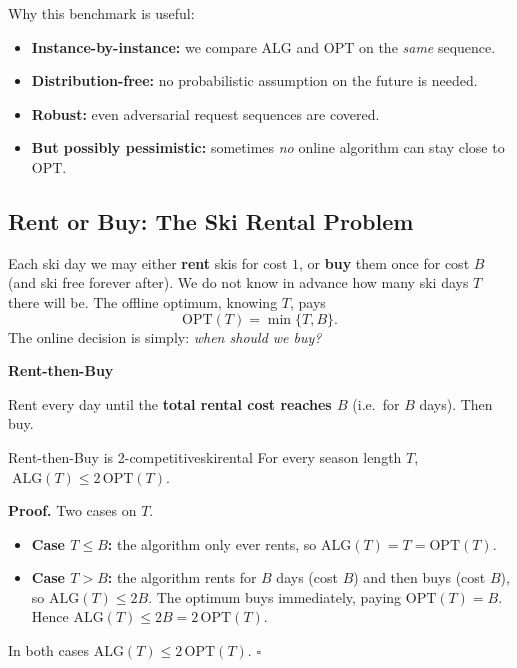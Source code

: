Why this benchmark is useful:
\begin{itemize}
  \item \textbf{Instance-by-instance:} we compare $\mathrm{ALG}$ and $\mathrm{OPT}$ on the \emph{same} sequence.
  \item \textbf{Distribution-free:} no probabilistic assumption on the future is needed.
  \item \textbf{Robust:} even adversarial request sequences are covered.
  \item \textbf{But possibly pessimistic:} sometimes \emph{no} online algorithm can stay close to $\mathrm{OPT}$.
\end{itemize}

\subsection{Rent or Buy: The Ski Rental Problem}

Each ski day we may either \textbf{rent} skis for cost $1$, or \textbf{buy} them once for cost $B$ (and ski free forever after). We do not know in advance how many ski days $T$ there will be. The offline optimum, knowing $T$, pays
\[
\mathrm{OPT}(T) = \min\{T, B\}.
\]
The online decision is simply: \emph{when should we buy?}

\begin{mdframed}[backgroundcolor=lightblue, linecolor=keyblue, linewidth=1pt]
\textbf{Rent-then-Buy}

Rent every day until the \textbf{total rental cost reaches $B$} (i.e.\ for $B$ days). Then buy.
\end{mdframed}

\begin{theorem}{Rent-then-Buy is 2-competitive}{skirental}
For every season length $T$, $\;\mathrm{ALG}(T) \le 2\,\mathrm{OPT}(T)$.
\end{theorem}

\textbf{Proof.} Two cases on $T$.
\begin{itemize}
  \item \textbf{Case $T \le B$:} the algorithm only ever rents, so $\mathrm{ALG}(T) = T = \mathrm{OPT}(T)$.
  \item \textbf{Case $T > B$:} the algorithm rents for $B$ days (cost $B$) and then buys (cost $B$), so $\mathrm{ALG}(T) \le 2B$. The optimum buys immediately, paying $\mathrm{OPT}(T) = B$. Hence $\mathrm{ALG}(T) \le 2B = 2\,\mathrm{OPT}(T)$.
\end{itemize}
In both cases $\mathrm{ALG}(T) \le 2\,\mathrm{OPT}(T)$. \hfill$\square$

